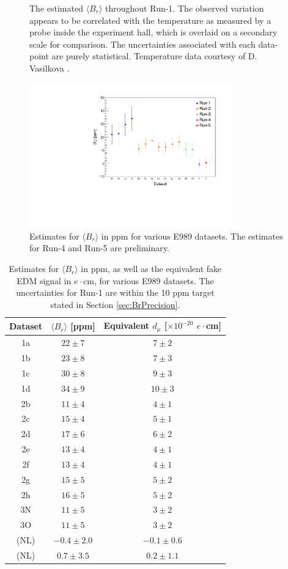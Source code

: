 {\begin{figure}[]
\caption{The estimated $\langle B_{r} \rangle$ throughout Run-1. The observed variation appears to be correlated with the temperature as measured by a probe inside the experiment hall, which is overlaid on a secondary scale for comparison. The uncertainties associated with each data-point are purely statistical. Temperature data courtesy of D. Vasilkova \cite{HallTemp}.}
\label{fig:BrTempOverlay}
\end{figure}
% 
\clearpage
%
\begin{figure}[]
\centering{}
\includegraphics[trim={0 0 0 0},clip,width=0.79\textwidth]{Images/Chapter4/BrVsDS2_empiricalMethod.pdf}
\caption{Estimates for $\langle B_{r} \rangle$ in ppm for various E989 datasets. The estimates for Run-4 and Run-5 are preliminary.}
\label{fig:BrVsDS}
\end{figure}   
%
\begin{table}[]
\centering
\begin{tabular}{ccc}
\hline
\hline
Dataset & $\langle B_{r} \rangle$ [ppm] & Equivalent $d_{\mu}$ [$\times10^{-20}$ $e\cdot$cm] \\ 
\hline
1a & $22\pm7$ & $7\pm2$ \\ 
1b & $23\pm8$ & $7\pm3$ \\
1c & $30\pm8$ & $9\pm3$ \\
1d & $34\pm9$ & $10\pm3$ \\ 
\hdashline 
2b & $11\pm4$ & $4\pm1$ \\
2c & $15\pm4$ & $5\pm1$ \\
2d & $17\pm6$ & $6\pm2$ \\
2e & $13\pm4$ & $4\pm1$ \\
2f & $13\pm4$ & $4\pm1$ \\
2g & $15\pm5$ & $5\pm2$ \\
2h & $16\pm5$ & $5\pm2$ \\
\hdashline
3N & $11\pm5$ & $3\pm2$ \\
3O & $11\pm5$ & $3\pm2$ \\
\hdashline
4 (NL) & $-0.4\pm2.0$ & $-0.1\pm0.6$ \\
\hdashline
5 (NL) & $0.7\pm3.5$ & $0.2\pm1.1$ \\
\hline
\hline
\end{tabular}
\caption{Estimates for $\langle B_{r} \rangle$ in ppm, as well as the equivalent fake EDM signal in $e\cdot$cm, for various E989 datasets. The uncertainties for Run-1 are within the 10 ppm target stated in Section \ref{sec:BrPrecision}.}
\label{tbl:BrResults}
\end{table}
\clearpage
}

